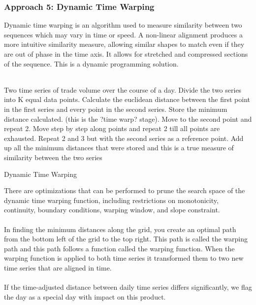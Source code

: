 \documentclass[11pt]{paper}
\begin{document}
\subsubsection*{Approach 5: Dynamic Time Warping}
Dynamic time warping is an algorithm used to measure similarity between two sequences which may vary in time or speed. A non-linear alignment produces a more intuitive similarity measure, allowing similar shapes to match even if they are out of phase in the time axis. It allows for stretched and compressed sections of the sequence. This is a dynamic programming solution. 
\\\\
\begin{algorithm}[H]
\SetAlgoLined
{}
 Two time series of trade volume over the course of a day. Divide the two series into K equal data points. Calculate the euclidean distance between the first point in the first series and every point in the second series. Store the minimum distance calculated. (this is the ?time warp? stage). Move to the second point and repeat 2. Move step by step along points and repeat 2 till all points are exhausted. Repeat 2 and 3 but with the second series as a reference point. Add up all the minimum distances that were stored and this is a true measure of similarity between the two series\;
 \caption{Dynamic Time Warping}
\end{algorithm}
There are optimizations that can be performed to prune the search space of the dynamic time warping function, including restrictions on monotonicity, continuity, boundary conditions, warping window, and slope constraint. 
\\\\In finding the minimum distances along the grid, you create an optimal path from the bottom left of the grid to the top right. This path is called the warping path and this path follows a function called the warping function. When the warping function is applied to both time series it transformed them to two new time series that are aligned in time.
\\\\If the time-adjusted distance between daily time series differs significantly, we flag the day as a special day with impact on this product.
\end{document}
